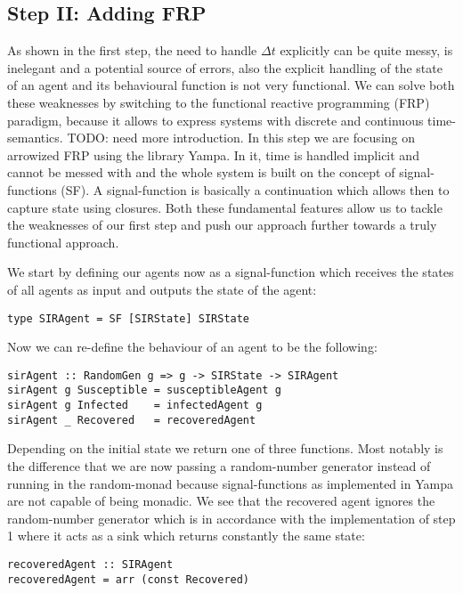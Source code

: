 \subsection{Step II: Adding FRP}
As shown in the first step, the need to handle $\Delta t$ explicitly can be quite messy, is inelegant and a potential source of errors, also the explicit handling of the state of an agent and its behavioural function is not very functional. We can solve both these weaknesses by switching to the functional reactive programming (FRP) paradigm, because it allows to express systems with discrete and continuous time-semantics. TODO: need more introduction. In this step we are focusing on arrowized FRP using the library Yampa. In it, time is handled implicit and cannot be messed with and the whole system is built on the concept of signal-functions (SF). A signal-function is basically a continuation which allows then to capture state using closures. 
Both these fundamental features allow us to tackle the weaknesses of our first step and push our approach further towards a truly functional approach.

We start by defining our agents now as a signal-function which receives the states of all agents as input and outputs the state of the agent:

\begin{verbatim}
type SIRAgent = SF [SIRState] SIRState 
\end{verbatim}

Now we can re-define the behaviour of an agent to be the following:

\begin{verbatim}
sirAgent :: RandomGen g => g -> SIRState -> SIRAgent
sirAgent g Susceptible = susceptibleAgent g
sirAgent g Infected    = infectedAgent g
sirAgent _ Recovered   = recoveredAgent
\end{verbatim}

Depending on the initial state we return one of three functions. Most notably is the difference that we are now passing a random-number generator instead of running in the random-monad because signal-functions as implemented in Yampa are not capable of being monadic. 
We see that the recovered agent ignores the random-number generator which is in accordance with the implementation of step 1 where it acts as a sink which returns constantly the same state:

\begin{verbatim}
recoveredAgent :: SIRAgent
recoveredAgent = arr (const Recovered)
\end{verbatim}

